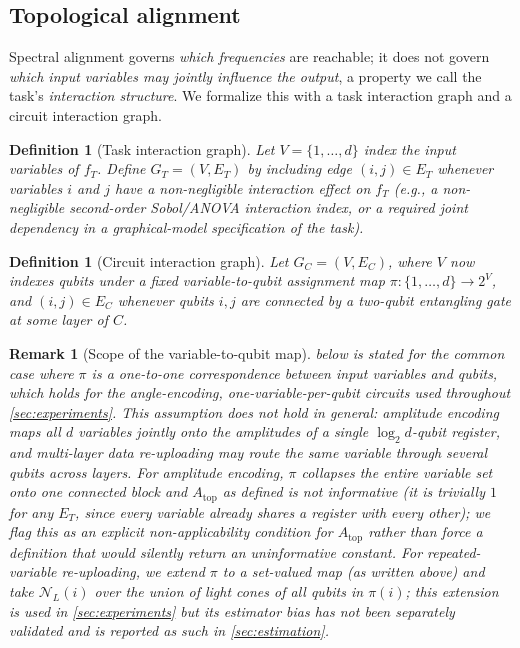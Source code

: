 \documentclass[11pt]{article}
\newtheorem{definition}[theorem]{Definition}
\newtheorem{remark}[theorem]{Remark}
\newcommand{\Atop}{A_{\mathrm{top}}}
\newcommand{\fT}{f_T}
\begin{document}
\subsection{Topological alignment}
\label{sec:topological-alignment}

Spectral alignment governs \emph{which frequencies} are reachable; it does not govern \emph{which input variables may jointly influence the output}, a property we call the task's \emph{interaction structure}. We formalize this with a task interaction graph and a circuit interaction graph.

\begin{definition}[Task interaction graph]
Let $V = \{1,\dots,d\}$ index the input variables of $\fT$. Define $G_T = (V, E_T)$ by including edge $(i,j) \in E_T$ whenever variables $i$ and $j$ have a non-negligible interaction effect on $\fT$ (e.g., a non-negligible second-order Sobol/ANOVA interaction index, or a required joint dependency in a graphical-model specification of the task).
\end{definition}

\begin{definition}[Circuit interaction graph]
Let $G_C = (V, E_C)$, where $V$ now indexes qubits under a fixed \emph{variable-to-qubit assignment map} $\pi : \{1,\dots,d\} \to 2^{V}$, and $(i,j) \in E_C$ whenever qubits $i,j$ are connected by a two-qubit entangling gate at some layer of $C$.
\end{definition}

\begin{remark}[Scope of the variable-to-qubit map]
\label{rem:pi-map}
 below is stated for the common case where $\pi$ is a one-to-one correspondence between input variables and qubits, which holds for the angle-encoding, one-variable-per-qubit circuits used throughout \cref{sec:experiments}. This assumption does \emph{not} hold in general: amplitude encoding maps all $d$ variables jointly onto the amplitudes of a single $\log_2 d$-qubit register, and multi-layer data re-uploading may route the same variable through several qubits across layers. For amplitude encoding, $\pi$ collapses the entire variable set onto one connected block and $\Atop$ as defined is not informative (it is trivially $1$ for any $E_T$, since every variable already shares a register with every other); we flag this as an explicit \emph{non-applicability} condition for $\Atop$ rather than force a definition that would silently return an uninformative constant. For repeated-variable re-uploading, we extend $\pi$ to a set-valued map (as written above) and take $\mathcal{N}_L(i)$ over the union of light cones of all qubits in $\pi(i)$; this extension is used in \cref{sec:experiments} but its estimator bias has not been separately validated and is reported as such in \cref{sec:estimation}.
\end{remark}
\end{document}
